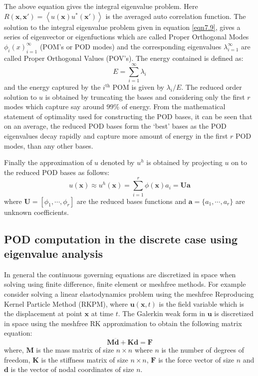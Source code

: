 \documentclass[10pt,letterpaper, onecolumn]{article}
\begin{document}
%
The above equation gives the integral eigenvalue problem. Here $R(\bm{x},\bm{x}') = \left \langle u(\bm{x}) u^*(\bm{x}') \right \rangle$ is the averaged auto correlation function. The solution to the integral eigenvalue problem given in equation \eqref{eqn7.9}, gives a series of eigenvector or eigenfuctions which are called Proper Orthogonal Modes ${\phi_i(x)}^{\infty}_{i=1}$ (POM's or POD modes) and the corresponding eigenvalues $\lambda^{\infty}_{i=1}$ are called Proper Orthogonal Values (POV's). The energy contained is defined as: 
%
\begin{equation}
E = \sum_{i=1}^{\infty} \lambda_i
\end{equation}
%
and the energy captured by the $i^\text{th}$ POM is given by $\lambda_i/E$. The reduced order solution to $u$ is obtained by truncating the bases and considering only the first $r$ modes which capture say around $99\%$ of energy. From the mathematical statement of optimality used for constructing the POD bases, it can be seen that on an average, the reduced POD bases form the `best' bases as the POD eigenvalues decay rapidly and capture more amount of energy in the first $r$ POD modes, than any other bases. 

Finally the approximation of $u$ denoted by $u^h$ is obtained by projecting $u$ on to the reduced POD bases as follows:
%
\begin{equation}
u(\bm{x}) \approx u^h(\bm{x}) = \sum^r_{i=1} \phi(\bm{x}) a_i  = \bm{U} \bm{a}
\end{equation}
%
where $\bm{U} = [\phi_1, \cdots, \phi_r]$ are the reduced bases functions and $\bm{a} = \{ a_1, \cdots, a_r\}$ are unknown coefficients. 


\subsection{POD computation in the discrete case using eigenvalue analysis}
In general the continuous governing equations are discretized in space when solving using finite difference, finite element or meshfree methods. For example consider solving a linear elastodynamics problem using the meshfree Reproducing Kernel Particle Method (RKPM), where $\bm{u}(\bm{x},t)$ is the field variable which is the displacement at point $\bm{x}$ at time $t$. The Galerkin weak form in $\bm{u}$ is discretized in space using the meshfree RK approximation to obtain the following matrix equation:
%
\begin{equation}
\bm{M} \ddot{\bm{d}} + \bm{K} \bm{d} = \bm{F}
\label{eqn7.12}
\end{equation}
%
where, $\bm{M}$ is the mass matrix of size $n \times n$ where $n$ is the number of degrees of freedom, $\bm{K}$ is the stiffness matrix of size $n \times n$, $\bm{F}$ is the force vector of size $n$ and $\bm{d}$ is the vector of nodal coordinates  of size $n$.
\end{document}
